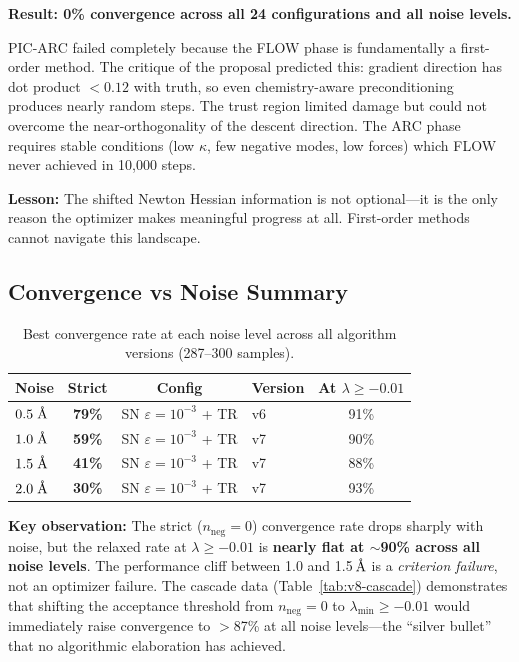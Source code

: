 \documentclass[11pt,a4paper]{article}
\newcommand{\eval}{\lambda}
\newcommand{\angstrom}{\text{\r{A}}}
\begin{document}
\textbf{Result: 0\% convergence across all 24 configurations and all noise levels.}

PIC-ARC failed completely because the FLOW phase is fundamentally a first-order method. The critique of the proposal predicted this: gradient direction has dot product $< 0.12$ with truth, so even chemistry-aware preconditioning produces nearly random steps. The trust region limited damage but could not overcome the near-orthogonality of the descent direction. The ARC phase requires stable conditions (low $\kappa$, few negative modes, low forces) which FLOW never achieved in 10,000 steps.

\textbf{Lesson:} The shifted Newton Hessian information is not optional---it is the only reason the optimizer makes meaningful progress at all. First-order methods cannot navigate this landscape.

\subsection{Convergence vs Noise Summary}
\label{sec:conv-vs-noise}

\begin{table}[H]
\centering
\caption{Best convergence rate at each noise level across all algorithm versions (287--300 samples).}
\label{tab:noise-summary}
\begin{tabular}{lcclc}
\toprule
Noise & Strict & Config & Version & At $\eval \geq -0.01$ \\
\midrule
$0.5\;\angstrom$ & \textbf{79\%} & SN $\varepsilon=10^{-3}$ + TR & v6 & 91\% \\
$1.0\;\angstrom$ & \textbf{59\%} & SN $\varepsilon=10^{-3}$ + TR & v7 & 90\% \\
$1.5\;\angstrom$ & \textbf{41\%} & SN $\varepsilon=10^{-3}$ + TR & v7 & 88\% \\
$2.0\;\angstrom$ & \textbf{30\%} & SN $\varepsilon=10^{-3}$ + TR & v7 & 93\% \\
\bottomrule
\end{tabular}
\end{table}

\textbf{Key observation:} The strict ($n_\text{neg} = 0$) convergence rate drops sharply with noise, but the relaxed rate at $\eval \geq -0.01$ is \textbf{nearly flat at $\sim$90\% across all noise levels}. The performance cliff between 1.0 and 1.5\,$\angstrom$ is a \emph{criterion failure}, not an optimizer failure. The cascade data (Table~\ref{tab:v8-cascade}) demonstrates that shifting the acceptance threshold from $n_\text{neg} = 0$ to $\eval_\text{min} \geq -0.01$ would immediately raise convergence to $>$87\% at all noise levels---the ``silver bullet'' that no algorithmic elaboration has achieved.
\end{document}
